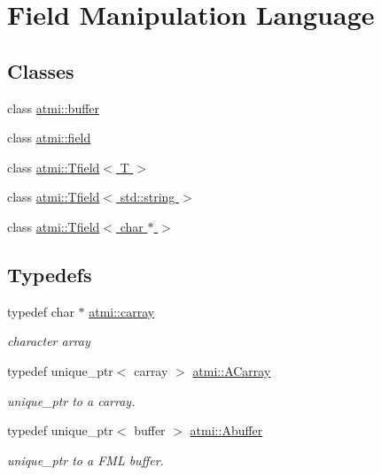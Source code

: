 \hypertarget{group__fml}{\section{Field Manipulation Language}
\label{group__fml}
}
\subsection*{Classes}
\begin{DoxyCompactItemize}
\item 
class \hyperlink{classatmi_1_1buffer}{atmi\+::buffer}
\item 
class \hyperlink{classatmi_1_1field}{atmi\+::field}
\item 
class \hyperlink{classatmi_1_1_tfield}{atmi\+::\+Tfield$<$ T $>$}
\item 
class \hyperlink{classatmi_1_1_tfield_3_01std_1_1string_01_4}{atmi\+::\+Tfield$<$ std\+::string $>$}
\item 
class \hyperlink{classatmi_1_1_tfield_3_01char_01_5_01_4}{atmi\+::\+Tfield$<$ char $\ast$ $>$}
\end{DoxyCompactItemize}
\subsection*{Typedefs}
\begin{DoxyCompactItemize}
\item 
\hypertarget{group__fml_ga8b57f9a4e2453d8e5d82ac0016e35e87}{typedef char $\ast$ \hyperlink{group__fml_ga8b57f9a4e2453d8e5d82ac0016e35e87}{atmi\+::carray}}\label{group__fml_ga8b57f9a4e2453d8e5d82ac0016e35e87}

\begin{DoxyCompactList}\small\item\em character array \end{DoxyCompactList}\item 
\hypertarget{group__fml_ga374230d2a2355a879f42c829eb2d70ff}{typedef unique\+\_\+ptr$<$ carray $>$ \hyperlink{group__fml_ga374230d2a2355a879f42c829eb2d70ff}{atmi\+::\+A\+Carray}}\label{group__fml_ga374230d2a2355a879f42c829eb2d70ff}

\begin{DoxyCompactList}\small\item\em unique\+\_\+ptr to a carray. \end{DoxyCompactList}\item 
\hypertarget{group__fml_ga268bae34ffaa2c2e72fabbcb54841934}{typedef unique\+\_\+ptr$<$ buffer $>$ \hyperlink{group__fml_ga268bae34ffaa2c2e72fabbcb54841934}{atmi\+::\+Abuffer}}\label{group__fml_ga268bae34ffaa2c2e72fabbcb54841934}

\begin{DoxyCompactList}\small\item\em unique\+\_\+ptr to a F\+M\+L buffer. \end{DoxyCompactList}\end{DoxyCompactItemize}
